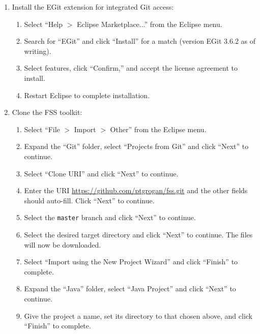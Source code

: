 \documentclass[]{article}
\begin{document}
\begin{enumerate}
\item Install the EGit extension for integrated Git access:
\begin{enumerate}
\item Select ``Help $>$ Eclipse Marketplace...'' from the Eclipse menu.
\item Search for ``EGit'' and click ``Install'' for a match (version EGit 3.6.2 as of writing).
\item Select features, click ``Confirm,'' and accept the license agreement to install.
\item Restart Eclipse to complete installation.
\end{enumerate}
\item Clone the FSS toolkit:
\begin{enumerate}
\item Select ``File $>$ Import $>$ Other'' from the Eclipse menu.
\item Expand the ``Git'' folder, select ``Projects from Git'' and click ``Next'' to continue.
\item Select ``Clone URI'' and click ``Next'' to continue.
\item Enter the URI \url{https://github.com/ptgrogan/fss.git} and the other fields should auto-fill. Click ``Next'' to continue.
\item Select the \texttt{master} branch and click ``Next'' to continue.
\item Select the desired target directory and click ``Next'' to continue. The files will now be downloaded.
\item Select ``Import using the New Project Wizard'' and click ``Finish'' to complete.
\item Expand the ``Java'' folder, select ``Java Project'' and click ``Next'' to continue.
\item Give the project a name, set its directory to that chosen above, and click ``Finish'' to complete.
\end{enumerate}

\end{enumerate}
\end{document}
